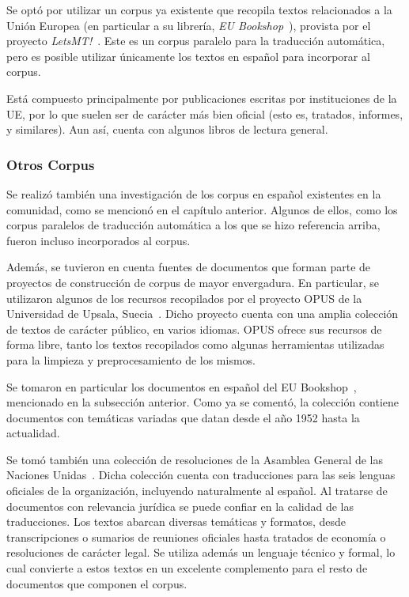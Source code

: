 Se optó por utilizar un corpus ya existente que recopila textos relacionados a la Unión Europea (en
particular a su librería, \textit{EU Bookshop}~\cite{EUBookshop}), provista por el proyecto
\textit{LetsMT!}~\cite{LetsMT}. Este es un corpus paralelo para la traducción automática, pero
es posible utilizar únicamente los textos en español para incorporar al corpus.

Está compuesto principalmente por publicaciones escritas por instituciones de la UE, por lo que
suelen ser de carácter más bien oficial (esto es, tratados, informes, y similares). Aun así, cuenta
con algunos libros de lectura general.


\subsubsection{Otros Corpus}

Se realizó también una investigación de los corpus en español existentes en la comunidad, como se
mencionó en el capítulo anterior. Algunos de ellos, como los corpus paralelos de traducción
automática a los que se hizo referencia arriba, fueron incluso incorporados al corpus.

Además, se tuvieron en cuenta fuentes de documentos que forman parte de proyectos de construcción de
corpus de mayor envergadura. En particular, se utilizaron algunos de los recursos recopilados por el
proyecto OPUS de la Universidad de Upsala, Suecia~\cite{OPUS}. Dicho proyecto cuenta con una amplia
colección de textos de carácter público, en varios idiomas. OPUS ofrece sus recursos de forma libre,
tanto los textos recopilados como algunas herramientas utilizadas para la limpieza y
preprocesamiento de los mismos.

Se tomaron en particular los documentos en español del EU Bookshop~\cite{EUBookshop}, mencionado en
la subsección anterior. Como ya se comentó, la colección contiene documentos con temáticas variadas
que datan desde el año 1952 hasta la actualidad.

Se tomó también una colección de resoluciones de la Asamblea General de las Naciones
Unidas~\cite{MultiUNDownload}.  Dicha colección cuenta con traducciones para las seis lenguas
oficiales de la organización, incluyendo naturalmente al español. Al tratarse de documentos con
relevancia jurídica se puede confiar en la calidad de las traducciones. Los textos abarcan diversas
temáticas y formatos, desde transcripciones o sumarios de reuniones oficiales hasta tratados de
economía o resoluciones de carácter legal. Se utiliza además un lenguaje técnico y formal, lo cual
convierte a estos textos en un excelente complemento para el resto de documentos que componen el
corpus.

